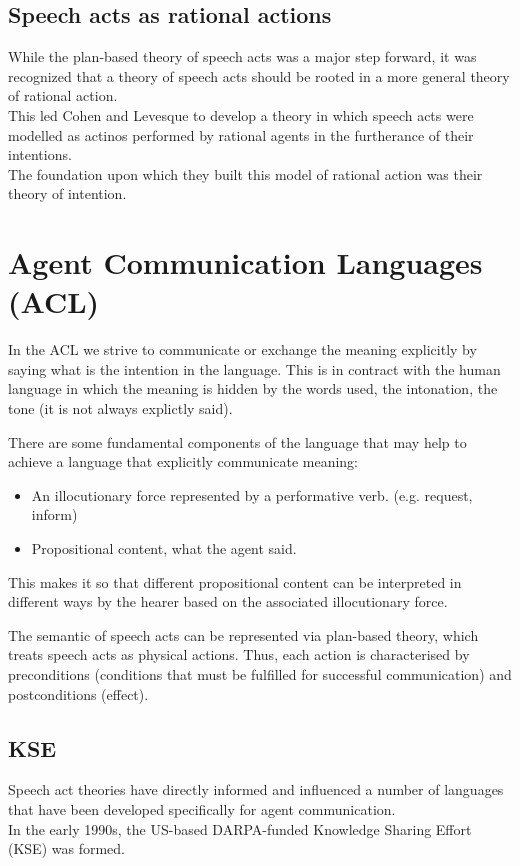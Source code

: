 \subsection{Speech acts as rational actions}
While the plan-based theory of speech acts was a major step forward, it was recognized that a theory of speech acts should be rooted in a more general theory of rational action.\\
This led Cohen and Levesque to develop a theory in which speech acts were modelled as actinos performed by rational agents in the furtherance of their intentions.\\
The foundation upon which they built this model of rational action was their theory of intention.

\section{Agent Communication Languages (ACL)}
In the ACL we strive to communicate or exchange the meaning explicitly by saying what is the intention in the language. This is in contract with the human language in which the meaning is hidden by the words used, the intonation, the tone (it is not always explictly said).

There are some fundamental components of the language that may help to achieve a language that explicitly communicate meaning:
\begin{itemize}
\item An illocutionary force represented by a performative verb. (e.g. request, inform)
\item Propositional content, what the agent said.
\end{itemize}
This makes it so that different propositional content can be interpreted in different ways by the hearer based on the associated illocutionary force.

The semantic of speech acts can be represented via plan-based theory, which treats speech acts as physical actions. Thus, each action is characterised by preconditions (conditions that must be fulfilled for successful communication) and postconditions (effect).

\subsection{KSE}
Speech act theories have directly informed and influenced a number of languages that have been developed specifically for agent communication.\\
In the early 1990s, the US-based DARPA-funded Knowledge Sharing Effort (KSE) was formed.

